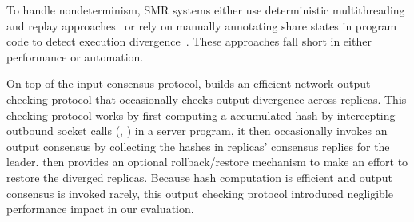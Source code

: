 To handle nondeterminism, SMR systems either use deterministic multithreading 
and replay approaches~\cite{rex:eurosys14,crane:sosp15,ddos:asplos13} or rely 
on manually annotating share states in program code to detect execution 
divergence~\cite{eve:osdi12}. These approaches fall short in either performance 
or automation.

On top of the input consensus protocol, \xxx builds an efficient network output 
checking protocol that occasionally checks output divergence across replicas. 
This checking protocol works by first computing a accumulated hash by 
intercepting outbound socket calls (\eg, \send) in a server program, it then 
occasionally invokes an output consensus by collecting the hashes in replicas' 
consensus replies for the leader. \xxx then provides an optional 
rollback/restore mechanism to make an effort to restore the diverged replicas. 
Because hash computation is efficient and output consensus is invoked rarely, 
this output checking protocol introduced negligible performance impact in our 
evaluation.


% 



